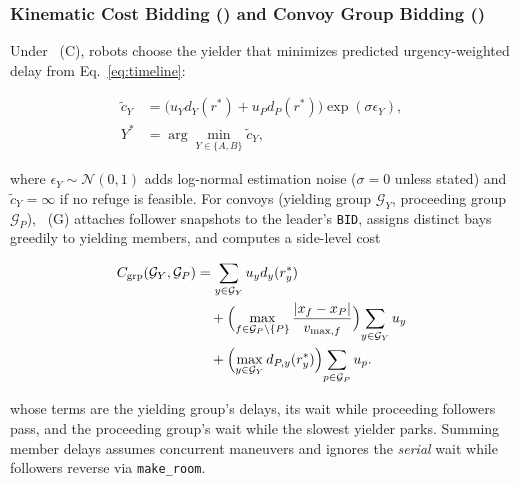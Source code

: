 \subsubsection{Kinematic Cost Bidding (\cb) and Convoy Group Bidding (\gb)}
Under \cb\ (C), robots choose the yielder that minimizes predicted urgency-weighted delay from Eq.~\eqref{eq:timeline}:

\begin{equation}
\begin{aligned}
\tilde{c}_Y &= \bigl(u_Y d_Y(r^\ast) + u_P d_P(r^\ast)\bigr)\exp(\sigma \epsilon_Y), \\
Y^\ast &= \arg\min_{Y\in\{A,B\}} \tilde{c}_Y,
\end{aligned}
\label{eq:costbid}
\end{equation}

where $\epsilon_Y \sim \mathcal{N}(0,1)$ adds log-normal estimation noise ($\sigma = 0$ unless stated) and $\tilde{c}_Y = \infty$ if no refuge is feasible. For convoys (yielding group $\mathcal{G}_Y$, proceeding group $\mathcal{G}_P$), \gb\ (G) attaches follower snapshots to the leader's \texttt{BID}, assigns distinct bays greedily to yielding members, and computes a side-level cost

\begin{equation}
\begin{aligned}
C_{\mathrm{grp}}(\mathcal{G}_Y,\mathcal{G}_P) &= \sum_{y\in\mathcal{G}_Y} u_y d_y(r_y^\ast) \\
&\quad + \Bigl(\max_{f\in\mathcal{G}_P\setminus\{P\}}\frac{|x_f-x_P|}{v_{\max,f}}\Bigr)\!\sum_{y\in\mathcal{G}_Y} u_y \\
&\quad + \Bigl(\max_{y\in\mathcal{G}_Y} d_{P,y}(r_y^\ast)\Bigr)\!\sum_{p\in\mathcal{G}_P} u_p.
\end{aligned}
\label{eq:groupbid}
\end{equation}

whose terms are the yielding group's delays, its wait while proceeding followers pass, and the proceeding group's wait while the slowest yielder parks. Summing member delays assumes concurrent maneuvers and ignores the \emph{serial} wait while followers reverse via \texttt{make\_room}.

